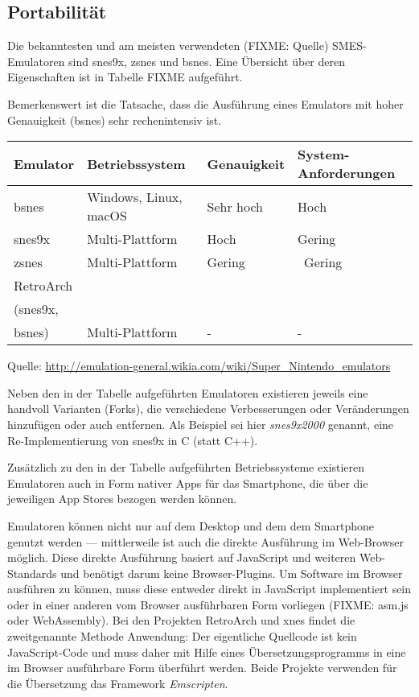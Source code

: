 \subsection{Portabilität}\label{portabilituxe4t}

Die bekanntesten und am meisten verwendeten (FIXME: Quelle)
SMES-Emulatoren sind snes9x, zsnes und bsnes. Eine Übersicht über deren
Eigenschaften ist in Tabelle FIXME aufgeführt.

Bemerkenswert ist die Tatsache, dass die Ausführung eines Emulators mit
hoher Genauigkeit (bsnes) sehr rechenintensiv ist.

\begin{longtable}[]{@{}llll@{}}
\toprule
Emulator & Betriebssystem & Genauigkeit &
System-Anforderungen\tabularnewline
\midrule
\endhead
bsnes & Windows, Linux, macOS & Sehr hoch & Hoch\tabularnewline
snes9x & Multi-Plattform & Hoch & Gering\tabularnewline
zsnes & Multi-Plattform & Gering & ~Gering\tabularnewline
RetroArch \\ (snes9x,\\ bsnes) & Multi-Plattform & - &
-\tabularnewline
\bottomrule
\end{longtable}

Quelle:
\url{http://emulation-general.wikia.com/wiki/Super_Nintendo_emulators}

Neben den in der Tabelle aufgeführten Emulatoren existieren jeweils eine
handvoll Varianten (Forks), die verschiedene Verbesserungen oder
Veränderungen hinzufügen oder auch entfernen. Als Beispiel sei hier
\emph{snes9x2000} genannt, eine Re-Implementierung von snes9x in C
(statt C++).

Zusätzlich zu den in der Tabelle aufgeführten Betriebssysteme existieren
Emulatoren auch in Form nativer Apps für das Smartphone, die über die
jeweiligen App Stores bezogen werden können.

Emulatoren können nicht nur auf dem Desktop und dem dem Smartphone
genutzt werden --- mittlerweile ist auch die direkte Ausführung im
Web-Browser möglich. Diese direkte Ausführung basiert auf JavaScript und
weiteren Web-Standards und benötigt darum keine Browser-Plugins. Um
Software im Browser ausführen zu können, muss diese entweder direkt in
JavaScript implementiert sein oder in einer anderen vom Browser
ausführbaren Form vorliegen (FIXME: asm.js oder WebAssembly). Bei den
Projekten RetroArch und xnes findet die zweitgenannte Methode Anwendung:
Der eigentliche Quellcode ist kein JavaScript-Code und muss daher mit
Hilfe eines Übersetzungsprogramms in eine im Browser ausführbare Form
überführt werden. Beide Projekte verwenden für die Übersetzung das
Framework \emph{Emscripten}.


